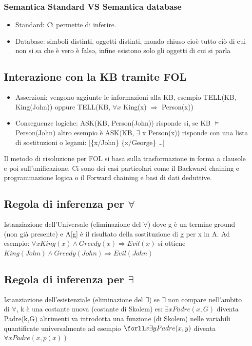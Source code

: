 \documentclass{article}
\begin{document}
\subsubsection{Semantica Standard VS Semantica database}
\begin{itemize}
    \item Standard: Ci permette di inferire.
    \item Database: simboli distinti, oggetti distinti, mondo chiuso cioè tutto ciò di cui non si sa che è vero è falso, infine esistono solo gli oggetti di cui si parla
\end{itemize}
\subsection{Interazione con la KB tramite FOL}
\begin{itemize}
    \item Asserzioni: vengono aggiunte le informazioni alla KB, esempio TELL(KB, King(John)) oppure TELL(KB, $\forall x$ King(x) $\Rightarrow$ Person(x))
    \item Conseguenze logiche: ASK(KB, Person(John)) risponde si, se KB $\models$ Person(John) altro esempio è ASK(KB, $\exists$ x Person(x)) risponde con una lista di sostituzioni o legami: [\{x/John\} \{x/George\} …]
\end{itemize}
Il metodo di risoluzione per FOL si basa sulla trasformazione in forma a clausole e poi sull'unificazione. Ci sono dei casi particolari come il Backward chaining e programmazione logica o il Forward chaining e basi di dati deduttive.
\subsection{Regola di inferenza per $\forall$}
Istanziazione dell’Universale (eliminazione del $\forall$) \quad
{} \newline
dove g è un termine ground (non già presente) e A[g] è il risultato della sostituzione di g per x in A. \newline
Ad esempio: $\forall x King(x) \land Greedy(x) \Rightarrow Evil(x)$ si ottiene $ King(John) \land Greedy(John) \Rightarrow Evil(John)$
\subsection{Regola di inferenza per $\exists$}
Istanziazione dell’esistenziale (eliminazione del $\exists$) \quad 
{} \newline
se $\exists$ non compare nell’ambito di $\forall$, k è una costante nuova (costante di Skolem) es: $\exists x Padre(x,G)$ diventa Padre(k,G) altrimenti va introdotta una funzione (di Skolem) nelle variabili quantificate universalmente ad esempio $\forll x \exists y Padre(x, y)$ diventa $ \forall x Padre(x, p(x))$
\end{document}
